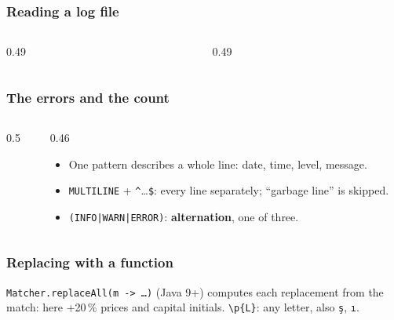 \documentclass[aspectratio=169,10pt,compress]{beamer}
\begin{document}
\begin{frame}[t,fragile] \frametitle{Reading a log file}
  \begin{columns}[T]
    \begin{column}{0.49\textwidth}
    \end{column}
    \begin{column}{0.49\textwidth}
    \end{column}
  \end{columns}
\end{frame}




\begin{frame}[t,fragile] \frametitle{The errors and the count}
  \begin{columns}[T]
    \begin{column}{0.5\textwidth}
    \end{column}
    \begin{column}{0.46\textwidth}
      \begin{itemize}\small
        \item One pattern describes a whole line: date, time, level, message.
        \item \texttt{MULTILINE} + \texttt{\textasciicircum}\dots\texttt{\$}: every line separately; ``garbage line'' is skipped.
        \item \texttt{(INFO|WARN|ERROR)}: \textbf{alternation}, one of three.
      \end{itemize}
    \end{column}
  \end{columns}
\end{frame}




\begin{frame}[t,fragile] \frametitle{Replacing with a function}

  \vspace{0.2em}
  \small \texttt{Matcher.replaceAll(m -> \dots)} (Java 9+) computes each replacement from the match: here +20\,\% prices and capital initials.
  \texttt{\textbackslash p\{L\}}: any letter, also \texttt{ş}, \texttt{ı}.
\end{frame}
\end{document}
